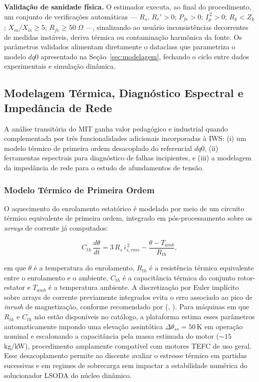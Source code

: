 \documentclass[a4paper]{ifacconf}
\begin{document}
\textbf{Validação de sanidade física.} O estimador executa, ao final do procedimento, um conjunto de verificações automáticas --- $R_s,\,R_r' > 0$; $P_{fe} > 0$; $I_\mu^{\,2} > 0$; $R_k < Z_k$; $X_m/X_{ls} \geq 5$; $R_{fe} \geq 50\;\Omega$ ---, sinalizando ao usuário inconsistências decorrentes de medidas instáveis, deriva térmica ou contaminação harmônica da fonte. Os parâmetros validados alimentam diretamente o dataclass que parametriza o modelo $dq0$ apresentado na Seção~\ref{sec:modelagem}, fechando o ciclo entre dados experimentais e simulação dinâmica.

\subsection{Modelagem Térmica, Diagnóstico Espectral e Impedância de Rede}
\label{subsec:diagnostico}

A análise transitória do MIT ganha valor pedagógico e industrial quando complementada por três funcionalidades adicionais incorporadas à IWS: (i) um modelo térmico de primeira ordem desacoplado do referencial $dq0$, (ii) ferramentas espectrais para diagnóstico de falhas incipientes, e (iii) a modelagem da impedância de rede para o estudo de afundamentos de tensão.

\subsubsection{Modelo Térmico de Primeira Ordem}

O aquecimento do enrolamento estatórico é modelado por meio de um circuito térmico equivalente de primeira ordem, integrado em pós-processamento sobre os \textit{arrays} de corrente já computados:

\begin{equation}
\label{eq:thermal}
C_{th}\,\frac{d\theta}{dt} = 3\,R_s\,i_{s,rms}^{\,2} - \frac{\theta - T_{amb}}{R_{th}},
\end{equation}

\noindent em que $\theta$ é a temperatura do enrolamento, $R_{th}$ é a resistência térmica equivalente entre o enrolamento e o ambiente, $C_{th}$ é a capacitância térmica do conjunto rotor-estator e $T_{amb}$ é a temperatura ambiente. A discretização por Euler implícito sobre arrays de corrente previamente integrados evita o erro associado ao pico de \textit{inrush} de magnetização, conforme recomendado por (\citeauthor{karakas2009aggregation}, \citeyear{karakas2009aggregation}). Para máquinas em que $R_{th}$ e $C_{th}$ não estão disponíveis no catálogo, a plataforma estima esses parâmetros automaticamente impondo uma elevação assintótica $\Delta\theta_{ss} = 50\,$K em operação nominal e escalonando a capacitância pela massa estimada do motor ($\sim 15\,$kg/kW), procedimento amplamente compatível com motores TEFC de uso geral. Esse desacoplamento permite ao discente avaliar o estresse térmico em partidas sucessivas e em regimes de sobrecarga sem impactar a estabilidade numérica do solucionador LSODA do núcleo dinâmico.
\end{document}
